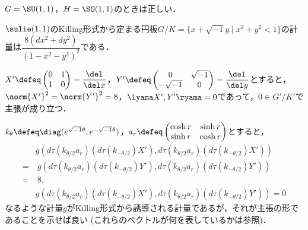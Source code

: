 \begin{prop}\label{prop:yosou-eg}
  $G = \SU(1,1) $，$H = \SO(1,1) $のときは正しい．
\end{prop}


\begin{lem}\label{lem:riem-metric-su11}
  $\sulie(1,1)$のKilling形式から定まる{\Poincare}円板$G/K =\{x+\sqrt{-1}y\mid x^2 + y^2 < 1 \} $の計量は$ \dfrac{8(dx^2 + dy^2)}{(1 - x^2 - y^2)^2} $である．
\end{lem}

\begin{pfwn}{}
  
$X' \defeq 
\begin{pmatrix}
  0 & 1 \\ 1 & 0
\end{pmatrix} = \dfrac{\del}{\del x}
$，$Y' \defeq 
\begin{pmatrix}
  0 & \sqrt{-1} \\ -\sqrt{-1} & 0
\end{pmatrix} = \dfrac{\del}{\del y}
$とすると，$\norm{X'}^2 = \norm{Y'}^2 = 8 $，$\lyama X', Y' \ryama = 0$であって，$0\in G'/K'$で主張が成り立つ．

$k_{\theta} \defeq \diag(e^{\sqrt{-1}\theta},e^{-\sqrt{-1}\theta}) $，$a_r\defeq
\begin{pmatrix}
  \cosh r & \sinh r \\  \sinh r & \cosh r
\end{pmatrix}
$とすると，
\begin{align*}
  &g(d\tau(k_{\theta/2}a_r)(d\tau(k_{-\theta/2})X'), d\tau(k_{\theta/2}a_r)(d\tau(k_{-\theta/2})X')) \\
  =&\ g (d\tau(k_{\theta/2}a_r)(d\tau(k_{-\theta/2})Y'), d\tau(k_{\theta/2}a_r)(d\tau(k_{-\theta/2})Y')) \\
  =&\ 8, \\
  &g(d\tau(k_{\theta/2}a_r)(d\tau(k_{-\theta/2})X'), d\tau(k_{\theta/2}a_r)(d\tau(k_{-\theta/2})Y'))  = 0
\end{align*}
なるような計量$g $がKilling形式から誘導される計量であるが，それが主張の形であることを示せば良い (これらのベクトルが何を表しているかは参照)．


\end{pfwn}
